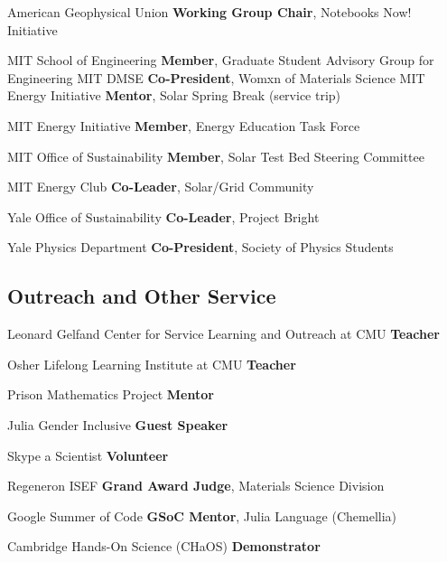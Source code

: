 {American Geophysical Union}
{\textbf{Working Group Chair}, Notebooks Now! Initiative}
{}

{MIT School of Engineering}
{\textbf{Member}, Graduate Student Advisory Group for Engineering}
{}
{MIT DMSE}
{\textbf{Co-President}, Womxn of Materials Science}
{}
{MIT Energy Initiative}
{\textbf{Mentor}, Solar Spring Break (service trip)}
{}

{MIT Energy Initiative}
{\textbf{Member}, Energy Education Task Force}
{}

{MIT Office of Sustainability}
{\textbf{Member}, Solar Test Bed Steering Committee}
{}

{MIT Energy Club}
{\textbf{Co-Leader}, Solar/Grid Community}
{}

{Yale Office of Sustainability}
{\textbf{Co-Leader}, Project Bright}
{}

{Yale Physics Department}
{\textbf{Co-President}, Society of Physics Students}
{}

\vspace{-2mm}
\subsection{Outreach and Other Service}
                      {Leonard Gelfand Center for Service Learning and Outreach at CMU}
                      {\textbf{Teacher}}{}

                      {Osher Lifelong Learning Institute at CMU}
                      {\textbf{Teacher}}{}
                     

{Prison Mathematics Project}
{\textbf{Mentor}}
{}

{Julia Gender Inclusive}
{\textbf{Guest Speaker}}
{}

{Skype a Scientist}
{\textbf{Volunteer}}
{}

{Regeneron ISEF}
{\textbf{Grand Award Judge}, Materials Science Division}
{}

{Google Summer of Code}
{\textbf{GSoC Mentor}, Julia Language (Chemellia)}
{}

{Cambridge Hands-On Science (CHaOS)}
{\textbf{Demonstrator}}
{}
